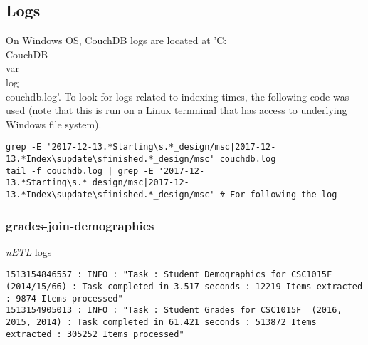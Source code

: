\subsection{Logs}
\label{appendix:logs}
On Windows OS, CouchDB logs are located at 'C:\\CouchDB\\var\\log\\couchdb.log'. To look for logs related to indexing times, the following code was used (note that this is run on a Linux termninal that has access to underlying Windows file system).

\begin{verbatim}
grep -E '2017-12-13.*Starting\s.*_design/msc|2017-12-13.*Index\supdate\sfinished.*_design/msc' couchdb.log
tail -f couchdb.log | grep -E '2017-12-13.*Starting\s.*_design/msc|2017-12-13.*Index\supdate\sfinished.*_design/msc' # For following the log
\end{verbatim}


\subsubsection*{grades-join-demographics}

\textit{nETL} logs
\begin{verbatim}
1513154846557 : INFO : "Task : Student Demographics for CSC1015F (2014/15/66) : Task completed in 3.517 seconds : 12219 Items extracted : 9874 Items processed"
1513154905013 : INFO : "Task : Student Grades for CSC1015F  (2016, 2015, 2014) : Task completed in 61.421 seconds : 513872 Items extracted : 305252 Items processed"
\end{verbatim}

